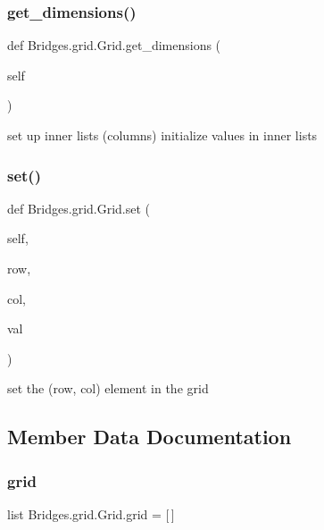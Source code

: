 \subsubsection{\texorpdfstring{get\+\_\+dimensions()}{get\_dimensions()}}
{\footnotesize\ttfamily def Bridges.\+grid.\+Grid.\+get\+\_\+dimensions (\begin{DoxyParamCaption}\item[{}]{self }\end{DoxyParamCaption})}



set up inner lists (columns) initialize values in inner lists 

\mbox{\label{class_bridges_1_1grid_1_1_grid_ab55f697cf4c4d4e712b3ee4e08328d9c}} 
\subsubsection{\texorpdfstring{set()}{set()}}
{\footnotesize\ttfamily def Bridges.\+grid.\+Grid.\+set (\begin{DoxyParamCaption}\item[{}]{self,  }\item[{}]{row,  }\item[{}]{col,  }\item[{}]{val }\end{DoxyParamCaption})}



set the (row, col) element in the grid 



\subsection{Member Data Documentation}
\mbox{\label{class_bridges_1_1grid_1_1_grid_a864fa138cef4168c62737c0623608a9e}} 
\subsubsection{\texorpdfstring{grid}{grid}\hspace{0.1cm}{\footnotesize\ttfamily [1/2]}}
{\footnotesize\ttfamily list Bridges.\+grid.\+Grid.\+grid = \mbox{[}$\,$\mbox{]}\hspace{0.3cm}{\ttfamily [static]}}

